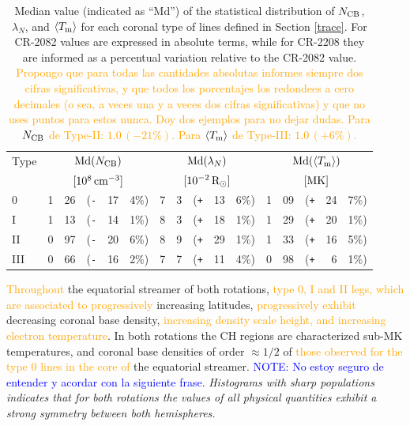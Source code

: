 \documentclass[namedreferences]{solarphysics}
\newcommand{\mrsun}{{\rm R_\odot}}
\newcommand{\med}{{\rm Md}}
\newcommand{\avgTe}{\left<\Tm\right>}
\newcommand{\MK}{{\rm MK}}
\newcommand{\lN}{\lambda_N}
\newcommand{\NCB}{N_{\rm CB}}
\newcommand{\Tm}{T_{\rm m}}
\newcommand{\aTm}{\left<\Tm\right>}
\newcommand{\Pl}{\texttt{+}}
\newcommand{\Mi}{\texttt{-}}
\def\diego#1{\textcolor{red}{#1}}
\def\albert#1{\textcolor{orange}{#1}}
\def\notebyalbert#1{\textcolor{blue}{NOTE: #1}}
\begin{document}
\begin{article}
\begin{table}
\begin{tabular}{l r@{.}l@{\hskip 0.05in} r@{\hskip 0.01in} r@{.}l  r@{.}l@{\hskip 0.05in} r@{\hskip 0.01in} r@{.}l r@{.}l@{\hskip 0.05in} r@{\hskip 0.01in} r@{.}l }
\hline
Type    & \multicolumn{5}{c}{$\med(\NCB)$}             & \multicolumn{5}{c}{$\med(\lN)$} & \multicolumn{5}{c}{$\med(\avgTe)$} \\
       & \multicolumn{5}{c}{$[10^8\,{\rm cm}^{-3}]$}  & \multicolumn{5}{c}{$[{\rm 10}^{-2}\,\mrsun]$} & \multicolumn{5}{c}{$[\MK]$} \\
\hline
0    & 1&26 &(\Mi&17&4\%)  &   7&3 &(\Pl&13&6\%) &   1&09 &(\Pl&24&7\%) \\
I    & 1&13 &(\Mi&14&1\%)  &   8&3 &(\Pl&18&1\%) &   1&29 &(\Pl&20&1\%) \\
II   & 0&97 &(\Mi&20&6\%)  &   8&9 &(\Pl&29&1\%) &   1&33 &(\Pl&16&5\%) \\
III  & 0&66 &(\Mi&16&2\%)  &   7&7 &(\Pl&11&4\%) &   0&98 &(\Pl&~6&1\%) \\
\hline          
\end{tabular}
\caption{Median value (indicated as ``Md'') of the statistical distribution of $\NCB$, $\lN$, and $\aTm$ for each coronal type of lines defined in Section \ref{trace}. For CR-2082 values are expressed in absolute terms, while for CR-2208 they are informed as a percentual variation relative to the CR-2082 value. \albert{Propongo que para todas las cantidades absolutas informes siempre dos cifras significativas, y que todos los porcentajes los redondees a cero decimales (o sea, a veces una y a veces dos cifras significativas) y que no uses puntos para estos nunca. Doy dos ejemplos para no dejar dudas. Para $\NCB$ de Type-II: $1.0\,(-21\%)$. Para $\aTm$ de Type-III: $1.0\,(+6\%)$.}}
\label{tabla_demt}
\end{table}

\albert{Throughout} the equatorial streamer of both rotations, \albert{type 0, I and II legs, which are associated to progressively} increasing latitudes, \albert{progressively exhibit} decreasing {coronal base} density, \albert{increasing density scale height, and increasing electron temperature}. In both rotations the CH regions are characterized sub-MK temperatures, and coronal base densities of order $\approx 1/2$ of \albert{those observed for the type 0 lines in the core of} the equatorial streamer. \notebyalbert{No estoy seguro de entender y acordar con la siguiente frase.} \emph{Histograms with sharp populations indicates that for both rotations the values of all physical quantities exhibit a strong symmetry between both hemispheres.}


\end{article}
\end{document}
